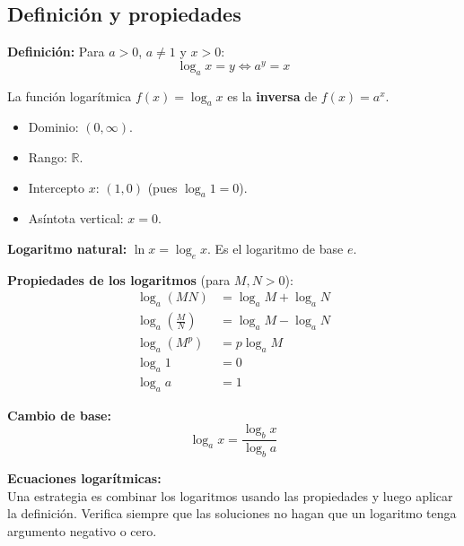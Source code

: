 \documentclass[12pt, letterpaper]{article}
\begin{document}
  \subsection{Definición y propiedades}

  \begin{cuadroteoria}
    \textbf{Definición:} Para $a > 0$, $a \neq 1$ y $x > 0$:
    $$\boxed{\log_a x = y \iff a^y = x}$$

    La función logarítmica $f(x) = \log_a x$ es la \textbf{inversa} de $f(x) = a^x$.

    \begin{itemize}[leftmargin=*]
      \item Dominio: $(0, \infty)$.
      \item Rango: $\mathbb{R}$.
      \item Intercepto $x$: $(1, 0)$ (pues $\log_a 1 = 0$).
      \item Asíntota vertical: $x = 0$.
    \end{itemize}

    \textbf{Logaritmo natural:} $\ln x = \log_e x$. Es el logaritmo de base $e$.
  \end{cuadroteoria}

  \begin{cuadrosolucion}
    \textbf{Propiedades de los logaritmos} (para $M, N > 0$):
    \begin{align*}
      \log_a (MN)                     & = \log_a M + \log_a N \\
      \log_a \left(\frac{M}{N}\right) & = \log_a M - \log_a N \\
      \log_a (M^p)                    & = p \log_a M          \\
      \log_a 1                        & = 0                   \\
      \log_a a                        & = 1
    \end{align*}

    \textbf{Cambio de base:}
    $$\log_a x = \frac{\log_b x}{\log_b a}$$
  \end{cuadrosolucion}

  \begin{cuadroadvertencia}
    \textbf{Ecuaciones logarítmicas:}\\
    Una estrategia es combinar los logaritmos usando las propiedades y luego aplicar la definición. Verifica siempre que las soluciones no hagan que un logaritmo tenga argumento negativo o cero.
  \end{cuadroadvertencia}
\end{document}
